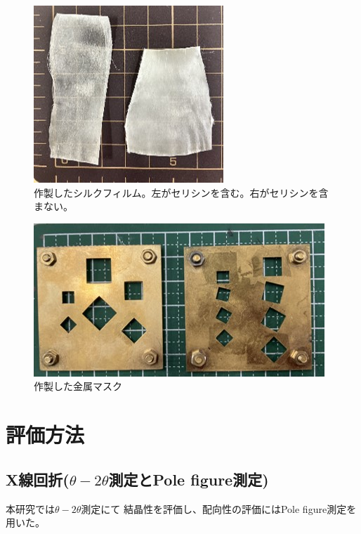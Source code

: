 \documentclass[dvipdfmx,12pt,a4paper]{jreport}
\begin{document}
		\begin{figure}[h]
			\centering
			\includegraphics[scale=1]{試料.jpg}
			\caption{作製したシルクフィルム。左がセリシンを含む。右がセリシンを含まない。}
			\label{試料外観}
		\end{figure}
		\begin{figure}[H]
			\centering
			\includegraphics[scale=0.9]{金属マスク.jpg}
			\caption{作製した金属マスク}
			\label{金属マスク}
		\end{figure}

		\newpage
		\section{評価方法}
			\subsection{X線回折($\theta - 2\theta$測定とPole figure測定)}
			本研究では$\theta-2\theta$測定にて
			結晶性を評価し、配向性の評価にはPole figure測定を用いた。
\end{document}
